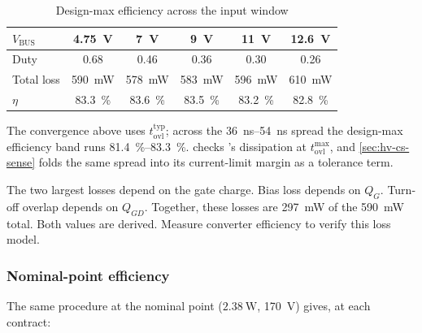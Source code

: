 {\footnotesize
  \begin{table}[htbp]
    \centering
    \caption{Design-max efficiency across the input window}\label{tab:hv-eta-line}
    \begin{tabular}{|l|c|c|c|c|c|}
      \hline
      $V_{\mathrm{BUS}}$ & \SI{4.75}{\volt} & \SI{7}{\volt} & \SI{9}{\volt} &
      \SI{11}{\volt} & \SI{12.6}{\volt} \\
      \hline
      Duty & 0.68 & 0.46 & 0.36 & 0.30 & 0.26 \\
      \hline
      Total loss & \SI{590}{\milli\watt} & \SI{578}{\milli\watt} &
      \SI{583}{\milli\watt} & \SI{596}{\milli\watt} & \SI{610}{\milli\watt} \\
      \hline
      $\eta$ & \SI{83.3}{\percent} & \SI{83.6}{\percent} & \SI{83.5}{\percent} &
      \SI{83.2}{\percent} & \SI{82.8}{\percent} \\
      \hline
    \end{tabular}
  \end{table}
}

The convergence above uses $t_{\mathrm{ovl}}^{\mathrm{typ}}$; across the
\SIrange{36}{54}{\nano\second} spread the design-max efficiency band runs
\SIrange{81.4}{83.3}{\percent}.  checks 's
dissipation at $t_{\mathrm{ovl}}^{\max}$, and \cref{sec:hv-cs-sense} folds the
same spread into its current-limit margin as a tolerance term.

The two largest losses depend on the  gate charge. Bias loss
depends on $Q_G$. Turn-off overlap depends on $Q_{GD}$. Together, these losses
are \SI{297}{\milli\watt} of the \SI{590}{\milli\watt} total. Both values are
derived. Measure converter efficiency to verify this loss model.

\subsubsection{Nominal-point efficiency}\label{sec:hv-op-nominal}

The same procedure at the nominal point ($\SI{2.38}{\watt}$, \SI{170}{\volt})
gives, at each contract:


